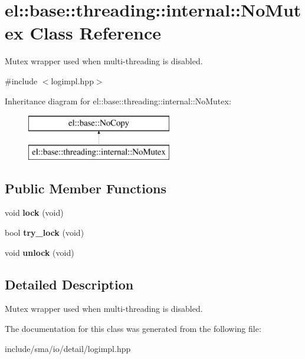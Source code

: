 \hypertarget{classel_1_1base_1_1threading_1_1internal_1_1NoMutex}{\section{el\-:\-:base\-:\-:threading\-:\-:internal\-:\-:No\-Mutex Class Reference}
\label{classel_1_1base_1_1threading_1_1internal_1_1NoMutex}
}


Mutex wrapper used when multi-\/threading is disabled.  




{\ttfamily \#include $<$logimpl.\-hpp$>$}

Inheritance diagram for el\-:\-:base\-:\-:threading\-:\-:internal\-:\-:No\-Mutex\-:\begin{figure}[H]
\begin{center}
\leavevmode
\includegraphics[height=2.000000cm]{classel_1_1base_1_1threading_1_1internal_1_1NoMutex}
\end{center}
\end{figure}
\subsection*{Public Member Functions}
\begin{DoxyCompactItemize}
\item 
\hypertarget{classel_1_1base_1_1threading_1_1internal_1_1NoMutex_a3b38e4e9411c924daa70d358cf561b3c}{void {\bfseries lock} (void)}\label{classel_1_1base_1_1threading_1_1internal_1_1NoMutex_a3b38e4e9411c924daa70d358cf561b3c}

\item 
\hypertarget{classel_1_1base_1_1threading_1_1internal_1_1NoMutex_a4c0c35a99cf41f26a7608fed5609d6ae}{bool {\bfseries try\-\_\-lock} (void)}\label{classel_1_1base_1_1threading_1_1internal_1_1NoMutex_a4c0c35a99cf41f26a7608fed5609d6ae}

\item 
\hypertarget{classel_1_1base_1_1threading_1_1internal_1_1NoMutex_a5a248c97fee2ef0087526f2f8d3cd26e}{void {\bfseries unlock} (void)}\label{classel_1_1base_1_1threading_1_1internal_1_1NoMutex_a5a248c97fee2ef0087526f2f8d3cd26e}

\end{DoxyCompactItemize}


\subsection{Detailed Description}
Mutex wrapper used when multi-\/threading is disabled. 

The documentation for this class was generated from the following file\-:\begin{DoxyCompactItemize}
\item 
include/sma/io/detail/logimpl.\-hpp\end{DoxyCompactItemize}

